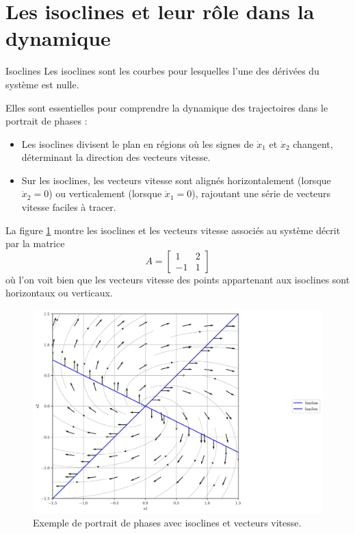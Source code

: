     \section{Les isoclines et leur rôle dans la dynamique}
        \begin{definition}{Isoclines}\label{def:isocline}
            Les isoclines sont les courbes pour lesquelles l'une des dérivées du système est nulle.
        \end{definition}
        Elles sont essentielles pour comprendre la dynamique des trajectoires dans le portrait de phases :
        \begin{itemize}
            \item Les isoclines divisent le plan en régions où les signes de $\dot{x}_1$ et $\dot{x}_2$ changent, déterminant la direction des vecteurs vitesse.
            \item Sur les isoclines, les vecteurs vitesse sont alignés horizontalement (lorsque $\dot{x}_2 = 0$) ou verticalement (lorsque $\dot{x}_1 = 0$), rajoutant une série de vecteurs vitesse faciles à tracer.
        \end{itemize}
        La figure \ref{fig:isoclines} montre les isoclines et les vecteurs vitesse associés au système décrit par la matrice
        \begin{equation}
            A = \begin{bmatrix} 1 & 2 \\ -1 & 1 \end{bmatrix}
        \end{equation}
        où l'on voit bien que les vecteurs vitesse des points appartenant aux isoclines sont horizontaux ou verticaux.
        \begin{figure}[ht!]
            \centering
            \includegraphics[width=\textwidth]{images/isoclines.jpg}
            \caption{Exemple de portrait de phases avec isoclines et vecteurs vitesse.}
            \label{fig:isoclines}
        \end{figure}
            
